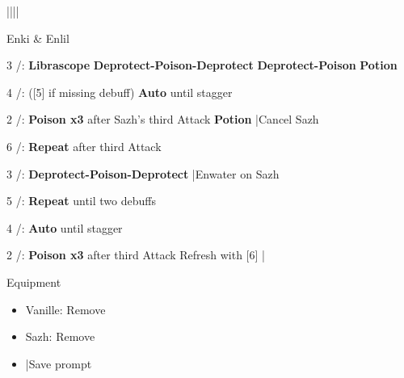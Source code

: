 \begin{mainlist}
	\item {}|\skip||\skip|\skip
\end{mainlist}
\begin{fight}{Enki \& Enlil}
	\item [3] \sab/\syn: \textbf{Librascope} \to \textbf{Deprotect-Poison-Deprotect} \to \textbf{Deprotect-Poison} \to \textbf{Potion}
	\item [4] \rav/\rav: ([5] if missing debuff) \textbf{Auto} until stagger
	\item [2] \sab/\com: \textbf{Poison x3} after Sazh's third Attack \to \textbf{\textbf{Potion}} |Cancel Sazh
	\item [6] \sab/\com: \textbf{Repeat} after third Attack
	\item [3] \sab/\syn: \textbf{Deprotect-Poison-Deprotect} |Enwater on Sazh
	\item [5] \sab/\rav: \textbf{Repeat} until two debuffs
	\item [4] \rav/\rav: \textbf{Auto} until stagger
	\item [2] \sab/\com: \textbf{Poison x3} after third Attack \to Refresh with [6] |\skip
\end{fight}
\begin{menu}
	\item Equipment
	\begin{itemize}
		\item Vanille: Remove
		\item Sazh: Remove
	\end{itemize}
\end{menu}
\begin{itemize}
	\item \skip|Save prompt
\end{itemize}
